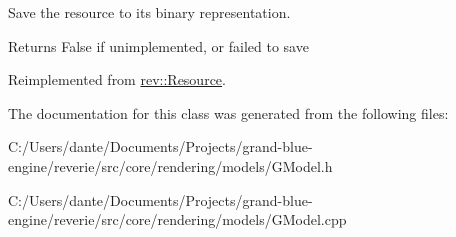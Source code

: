 Save the resource to its binary representation. 

\begin{DoxyReturn}{Returns}
False if unimplemented, or failed to save 
\end{DoxyReturn}


Reimplemented from \mbox{\hyperlink{classrev_1_1_resource_afbd64f3d18060ce32a995dbfb5472f91}{rev\+::\+Resource}}.



The documentation for this class was generated from the following files\+:\begin{DoxyCompactItemize}
\item 
C\+:/\+Users/dante/\+Documents/\+Projects/grand-\/blue-\/engine/reverie/src/core/rendering/models/G\+Model.\+h\item 
C\+:/\+Users/dante/\+Documents/\+Projects/grand-\/blue-\/engine/reverie/src/core/rendering/models/G\+Model.\+cpp\end{DoxyCompactItemize}
